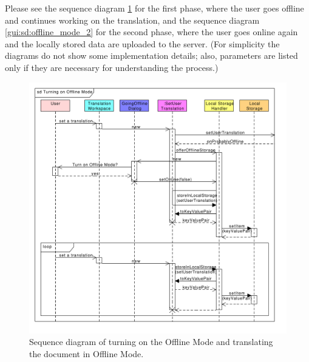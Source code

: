 
Please see the sequence diagram \ref{gui:sd:offline_mode_1} for the first phase, where the user goes offline and continues working on the translation, and the sequence diagram \ref{gui:sd:offline_mode_2} for the second phase, where the user goes online again and the locally stored data are uploaded to the server.
(For simplicity the diagrams do not show some implementation details;
also, parameters are listed only if they are necessary for understanding the process.)

\begin{figure}[h]
\begin{center}
\includegraphics[scale=0.55]{figures/offline_mode_1.pdf}
\end{center}
\caption{Sequence diagram of turning on the Offline Mode and translating the document in Offline Mode.}\label{gui:sd:offline_mode_1}
\end{figure}


